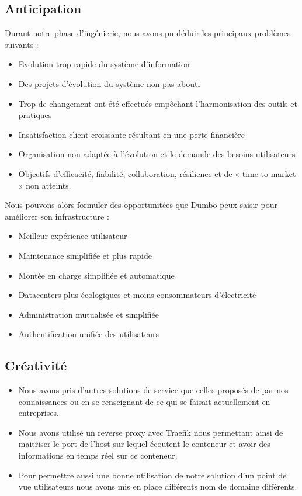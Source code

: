 \subsection{Anticipation}

Durant notre phase d'ingénierie, nous avons pu déduir les principaux problèmes suivants :

\begin{itemize}
\item Evolution trop rapide du système d’information 
\item Des projets d’évolution du système non pas abouti
\item Trop de changement ont été effectués empêchant l’harmonisation des outils et pratiques
\item Insatisfaction client croissante résultant en une perte financière 
\item Organisation non adaptée à l’évolution et le demande des besoins utilisateurs
\item Objectifs d'efficacité, fiabilité, collaboration, résilience et de « time to market » non atteints.
\end{itemize}

Nous pouvons alors formuler des opportunitées que Dumbo peux saisir pour améliorer son infrastructure :

\begin{itemize}
\item Meilleur expérience utilisateur
\item Maintenance simplifiée et plus rapide
\item Montée en charge simplifiée et automatique
\item Datacenters plus écologiques et moins consommateurs d'électricité
\item Administration mutualisée et simplifiée
\item Authentification unifiée des utilisateurs
\end{itemize}

\subsection{Créativité}

\begin{itemize}
\item Nous avons pris d'autres solutions de service que celles proposés de par nos connaissances ou en se renseignant de ce qui se faisait actuellement en entreprises.
\item Nous avons utilisé un reverse proxy avec Traefik nous permettant ainsi de maitriser le port de l'host sur lequel écoutent le conteneur et avoir des informations en temps réel sur ce conteneur.
\item Pour permettre aussi une bonne utilisation de notre solution d'un point de vue utilisateurs nous avons mis en place différents nom de domaine différents.
\end{itemize}


